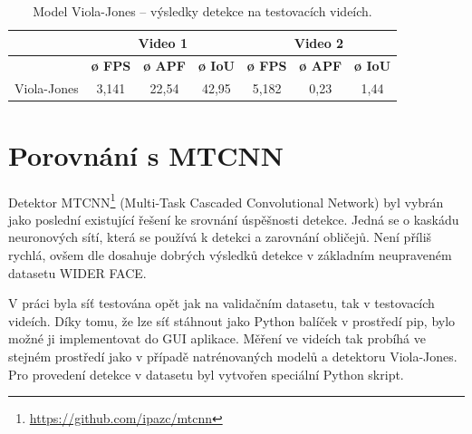 \begin{table}[H]
  \centering
  \begin{tabular}{c|ccc|ccc|}
  \cline{2-7}
                                                               & \multicolumn{3}{c|}{\cellcolor[HTML]{CBCEFB}\textbf{Video 1}}                                                                              & \multicolumn{3}{c|}{\cellcolor[HTML]{CBCEFB}\textbf{Video 2}}                                                                              \\ \hline
  \rowcolor[HTML]{E0DBDB} 
  \multicolumn{1}{|c|}{\cellcolor[HTML]{E0DBDB}\textbf{Model}} & \multicolumn{1}{c|}{\cellcolor[HTML]{E0DBDB}\textbf{ø FPS}} & \multicolumn{1}{c|}{\cellcolor[HTML]{E0DBDB}\textbf{ø APF}} & \textbf{ø IoU} & \multicolumn{1}{c|}{\cellcolor[HTML]{E0DBDB}\textbf{ø FPS}} & \multicolumn{1}{c|}{\cellcolor[HTML]{E0DBDB}\textbf{ø APF}} & \textbf{ø IoU} \\ \hline
  \multicolumn{1}{|c|}{\cellcolor[HTML]{E0DBDB}Viola-Jones}    & \multicolumn{1}{c|}{3,141}                                  & \multicolumn{1}{c|}{22,54}                                  & 42,95          & \multicolumn{1}{c|}{5,182}                                  & \multicolumn{1}{c|}{0,23}                                   & 1,44           \\ \hline
  \end{tabular}
  \label{tabulka:violajonesvidea}
  \caption{Model Viola-Jones -- výsledky detekce na testovacích videích.}
\end{table}

\section{Porovnání s MTCNN}
\label{sekce:mtcnn}
Detektor MTCNN\footnote{\url{https://github.com/ipazc/mtcnn}} (Multi-Task Cascaded Convolutional Network) \cite{mtcnnpaper} byl vybrán jako poslední existující řešení ke srovnání úspěšnosti detekce. Jedná se o kaskádu neuronových sítí, která se používá k detekci a zarovnání obličejů. Není příliš rychlá, ovšem dle \cite{mtcnnpaper} dosahuje dobrých výsledků detekce v základním neupraveném datasetu WIDER FACE.

V práci byla síť testována opět jak na validačním datasetu, tak v testovacích videích. Díky tomu, že lze síť stáhnout jako Python balíček v prostředí pip, bylo možné ji implementovat do GUI aplikace. Měření ve videích tak probíhá ve stejném prostředí jako v případě natrénovaných modelů a detektoru Viola-Jones. Pro provedení detekce v datasetu byl vytvořen speciální Python skript.


